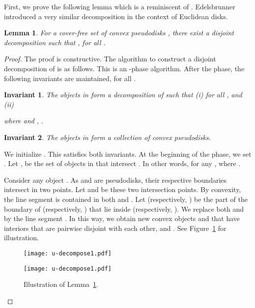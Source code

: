 \documentclass[a4paper,11pt]{article}
\newtheorem{lemma}{Lemma}
\newtheorem{invariant}{Invariant}
\begin{document}
First, we prove the 
following lemma which is a reminiscent of \cite[Lem 3.3]{Ray}.  {Edelsbrunner~\cite{Edelsbrunner95} introduced a very similar decomposition in the context of Euclidean disks.}



\begin{lemma} \label{lDecompose1}
For a cover-free set  of convex pseudodisks , 
there exist a disjoint decomposition  such that , for all .
\end{lemma}



\begin{proof}
The proof is constructive.
The algorithm to construct a disjoint decomposition      of  
is as  follows. This is an -phase algorithm.
After the  phase, the  following invariants are maintained, for all  
.

\begin{invariant}\label{inv1.1}
The objects in 
 form a 
decomposition of  such that (i)  for all 
, and  (ii) 
 
where  and , . 

\end{invariant}

\begin{invariant}\label{inv1.2}
The objects in  form a {collection of} convex pseudodisks. 
\end{invariant}

We initialize . This satisfies both 
invariants.
At the beginning of the
 phase,  we set . 
Let , 
be the set of  objects in   
that intersect  . In other words,
 for any  , 
where .


Consider any  object . 
As   and  are pseudodisks, 
their respective boundaries intersect in two points.
 Let 
 and  be these  two intersection points. 
By convexity, the line segment   is contained in both
   and .
Let  (respectively, 
) 
be the part of the boundary of  (respectively, 
) 
that lie
inside  (respectively, ).
 We replace  both  and 
 by the line segment . In this way, we obtain new  convex objects 
 and   that have interiors that are  pairwise disjoint  with each other, and 
.  See 
Figure~\ref{figDecompose2} for illustration. 

\begin{figure}[!htb]
    \centering
    \begin{minipage}{.5\textwidth}
        \centering
        \texttt{[image: u-decompose1.pdf]}


    \end{minipage}\begin{minipage}{0.5\textwidth}
        \centering
        \texttt{[image: u-decompose1.pdf]}
\end{minipage}
     \caption{{Illustration of Lemma~\ref{lDecompose1}}.}
      \label{figDecompose2}
\end{figure}




\end{proof}
\end{document}
